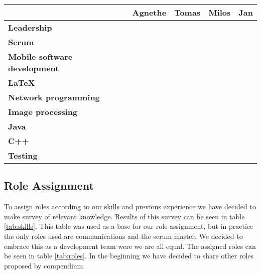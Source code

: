 \documentclass{article}
\newcommand{\ra}[1]{\renewcommand{\arraystretch}{#1}}
\newcommand{\colorA}{\cellcolor{green!100}}
\newcommand{\colorB}{\cellcolor{green!60}}
\newcommand{\colorC}{\cellcolor{yellow!75}}
\newcommand{\colorD}{\cellcolor{orange!90}}
\newcommand{\colorE}{\cellcolor{red!80}}
\begin{document}
\begin{table*}\centering \ra{1.3}
    \caption{Skills and previous experience table. Coding:
        \textcolor{green!100}{$\bullet$} expert,
        \textcolor{green!60}{$\bullet$} experienced,
        \textcolor{yellow!75}{$\bullet$} neutral,
        \textcolor{orange!90}{$\bullet$} little experience,
        \textcolor{red!80}{$\bullet$} no experience}
    \label{tab:skills}
    \vspace{2mm}
    \begin{tabular}{lcccc}
    \toprule
                                & Agnethe   & Tomas & Milos & Jan \\
    \midrule
    \textbf{Leadership                 } & \colorB & \colorE & \colorD & \colorC \\ 
    \textbf{Scrum                      } & \colorB & \colorE & \colorE & \colorE \\ 
    \textbf{Mobile software development} & \colorC & \colorE & \colorB & \colorE \\ 
    \textbf{\LaTeX                     } & \colorE & \colorB & \colorE & \colorB \\ 
    \textbf{Network programming        } & \colorD & \colorC & \colorC & \colorC \\ 
    \textbf{Image processing           } & \colorE & \colorC & \colorE & \colorD \\ 
    \textbf{Java                       } & \colorC & \colorD & \colorA & \colorE \\ 
    \textbf{C++                        } & \colorE & \colorB & \colorC & \colorB \\ 
    \textbf{Testing                    } & \colorE & \colorB & \colorD & \colorC \\
    \bottomrule
    \end{tabular}
\end{table*}


\subsection{Role Assignment}
To assign roles according to our skills and previous experience we have decided to make survey of relevant knowledge. 
Results of this survey can be seen in table \ref{tab:skills}. 
This table was used as a base for our role assignment, but in practice the only roles used are communications and the scrum master. We decided to embrace this as a development team were we are all equal. 
The assigned roles can be seen in table \ref{tab:roles}. 
In the beginning we have decided to share other roles proposed by compendium.
\end{document}
